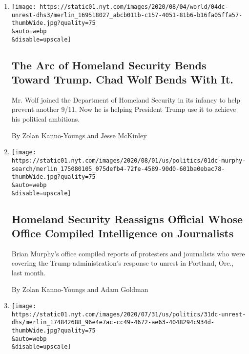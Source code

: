 \begin{enumerate}
\def\labelenumi{\arabic{enumi}.}
\item
  \href{/2020/08/04/us/politics/trump-homeland-security.html}{}

  \texttt{[image: https://static01.nyt.com/images/2020/08/04/world/04dc-unrest-dhs3/merlin\_169518027\_abcb011b-c157-4051-81b6-b16fa05ffa57-thumbWide.jpg?quality=75\\\&auto=webp\\\&disable=upscale]}

  \hypertarget{the-arc-of-homeland-security-bends-toward-trump-chad-wolf-bends-with-it}{%
  \subsection{The Arc of Homeland Security Bends Toward Trump. Chad Wolf
  Bends With
  It.}\label{the-arc-of-homeland-security-bends-toward-trump-chad-wolf-bends-with-it}}

  Mr. Wolf joined the Department of Homeland Security in its infancy to
  help prevent another 9/11. Now he is helping President Trump use it to
  achieve his political ambitions.

  By Zolan Kanno-Youngs and Jesse McKinley
\item
  \href{/2020/08/01/us/politics/brian-murphy-homeland-security-protesters.html}{}

  \texttt{[image: https://static01.nyt.com/images/2020/08/01/us/politics/01dc-murphy-search/merlin\_175080105\_075defb4-72fe-4589-90d0-601ba0ebac78-thumbWide.jpg?quality=75\\\&auto=webp\\\&disable=upscale]}

  \hypertarget{homeland-security-reassigns-official-whose-office-compiled-intelligence-on-journalists}{%
  \subsection{Homeland Security Reassigns Official Whose Office Compiled
  Intelligence on
  Journalists}\label{homeland-security-reassigns-official-whose-office-compiled-intelligence-on-journalists}}

  Brian Murphy's office compiled reports of protesters and journalists
  who were covering the Trump administration's response to unrest in
  Portland, Ore., last month.

  By Zolan Kanno-Youngs and Adam Goldman
\item
  \href{/2020/07/31/us/politics/homeland-security-portland.html}{}

  \texttt{[image: https://static01.nyt.com/images/2020/07/31/us/politics/31dc-unrest-dhs/merlin\_174842688\_96e4e7ac-cc49-4672-ae63-4048294c934d-thumbWide.jpg?quality=75\\\&auto=webp\\\&disable=upscale]}


\end{enumerate}

